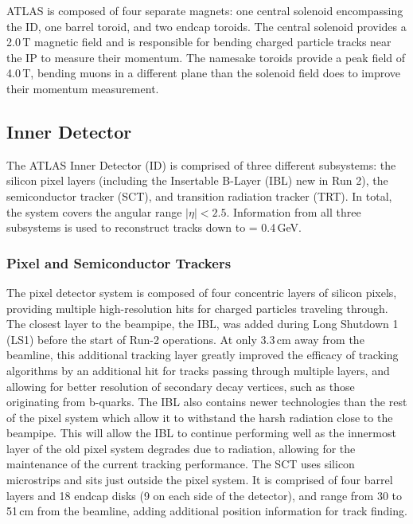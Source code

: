 ATLAS is composed of four separate magnets: one central solenoid encompassing the ID, one barrel toroid, and two endcap toroids.  The central solenoid provides a 2.0\,T magnetic field and is responsible for bending charged particle tracks near the IP to measure their momentum.  The namesake toroids provide a peak field of 4.0\,T, bending muons in a different plane than the solenoid field does to improve their momentum measurement.

\subsection{Inner Detector}

The ATLAS Inner Detector (ID) is comprised of three different subsystems: the silicon pixel layers (including the Insertable B-Layer (IBL) new in Run 2), the semiconductor tracker (SCT), and transition radiation tracker (TRT).  In total, the system covers the angular range $|\eta|<2.5$.  Information from all three subsystems is used to reconstruct tracks down to \pt = 0.4\,GeV.\cite{IDPerf}

\subsubsection{Pixel and Semiconductor Trackers}

The pixel detector system is composed of four concentric layers of silicon pixels, providing multiple high-resolution hits for charged particles traveling through.  The closest layer to the beampipe, the IBL, was added during Long Shutdown 1 (LS1) before the start of Run-2 operations.  At only 3.3\,cm away from the beamline, this additional tracking layer greatly improved the efficacy of tracking algorithms by an additional hit for tracks passing through multiple layers, and allowing for better resolution of secondary decay vertices, such as those originating from b-quarks.  The IBL also contains newer technologies than the rest of the pixel system which allow it to withstand the harsh radiation close to the beampipe.  This will allow the IBL to continue performing well as the innermost layer of the old pixel system degrades due to radiation, allowing for the maintenance of the current tracking performance.
The SCT uses silicon microstrips and sits just outside the pixel system.  It is comprised of four barrel layers and 18 endcap disks (9 on each side of the detector), and range from 30 to 51\,cm from the beamline, adding additional position information for track finding.

